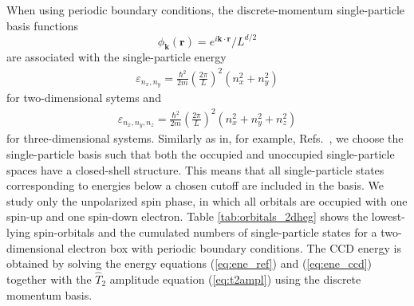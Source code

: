 \documentclass[a4paper,12pt]{report}
\begin{document}

When using periodic boundary conditions, the 
discrete-momentum single-particle basis functions 
\[
\phi_{\mathbf{k}}(\mathbf{r}) =
e^{i\mathbf{k}\cdot \mathbf{r}}/L^{d/2}
\]
are associated with 
the single-particle energy   
\begin{align}
  \varepsilon_{n_{x}, n_{y}} = \frac{\hbar^{2}}{2m} 
  \left( \frac{2\pi }{L}\right)^{2}
  \left( n_{x}^{2} + n_{y}^{2}\right)
\end{align}
for two-dimensional sytems and 
\begin{align}
  \varepsilon_{n_{x}, n_{y}, n_{z}} = \frac{\hbar^{2}}{2m}
  \left( \frac{2\pi }{L}\right)^{2}
  \left( n_{x}^{2} + n_{y}^{2} + n_{z}^{2}\right)
\end{align} 
for three-dimensional systems. Similarly as in, for example, 
Refs.~\cite{shepherd_2012a,roggero2013,hagen2014}, we choose 
the single-particle basis such that both the occupied and 
unoccupied single-particle spaces have a closed-shell 
structure. This means that all single-particle states 
corresponding to energies below a chosen cutoff are
included in the basis. We study only the unpolarized spin
phase, in which all orbitals are occupied with one spin-up 
and one spin-down electron. Table \ref{tab:orbitals_2dheg}
shows the lowest-lying spin-orbitals and the cumulated
numbers of single-particle states for a two-dimensional
electron box with periodic boundary conditions.
The CCD energy is obtained by solving the energy
equations (\ref{eq:ene_ref}) and (\ref{eq:ene_ccd})
together with the $\hat{T}_{2}$ amplitude equation
(\ref{eq:t2ampl}) using the discrete momentum basis.
\end{document}
